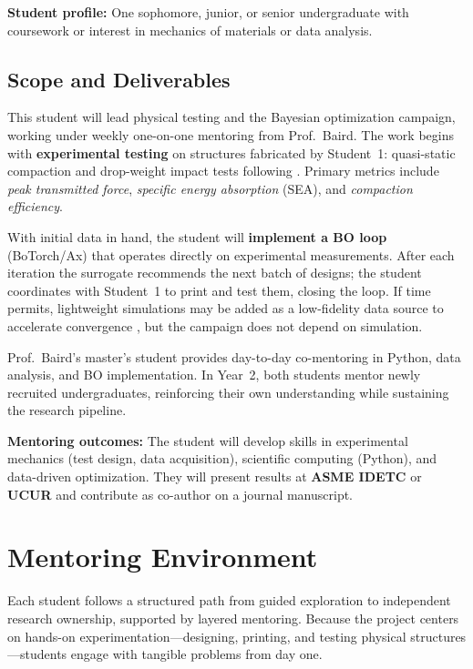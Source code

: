 \documentclass[11pt]{article}
\begin{document}
\textbf{Student profile:} One sophomore, junior, or senior undergraduate with
coursework or interest in mechanics of materials or data analysis.

\subsection*{Scope and Deliverables}

This student will lead physical testing and the Bayesian optimization
campaign, working under weekly one-on-one mentoring from Prof.~Baird.  The work
begins with \textbf{experimental testing} on structures fabricated by
Student~1: quasi-static compaction and drop-weight impact tests following
\citet{pajunen2019design}.  Primary metrics include \emph{peak transmitted
force}, \emph{specific energy absorption} (SEA), and \emph{compaction
efficiency}.

With initial data in hand, the student will \textbf{implement a BO loop}
(BoTorch/Ax) that operates directly
on experimental measurements.  After each iteration the surrogate recommends
the next batch of designs; the student coordinates with Student~1 to print and
test them, closing the loop.  If time permits,
lightweight simulations may be added as a low-fidelity data
source to accelerate convergence \citep{mo2023accelerated}, but the campaign
does not depend on simulation.

Prof.~Baird's master's student provides day-to-day co-mentoring in Python,
data analysis, and BO implementation.
In Year~2, both students mentor newly recruited undergraduates, reinforcing
their own understanding while sustaining the research pipeline.

\textbf{Mentoring outcomes:} The student will develop skills in experimental
mechanics (test design, data acquisition), scientific computing (Python),
and data-driven optimization.  They will present results at \textbf{ASME IDETC}
or \textbf{UCUR} and contribute as co-author on a journal manuscript.

\section{Mentoring Environment}
\label{sec:mentoring}

Each student follows a structured path from guided exploration
to independent research ownership, supported by layered mentoring.
Because the project centers on hands-on experimentation---designing,
printing, and testing physical structures---students engage with tangible
problems from day one.
\end{document}

